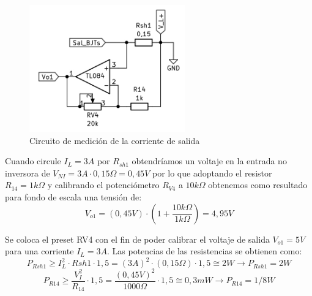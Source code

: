 \begin{figure} [H]
	\centering
	\includegraphics[width=0.6\textwidth]{./imagenes/Sensor_corriente.png}
	\caption{Circuito de medición de la corriente de salida}
	\label{F:Sensor_corriente}
\end{figure} \par 

Cuando circule $I_L =3A$ por $R_{sh1}$ obtendríamos un voltaje en la entrada no inversora de $V_{NI} =3A\cdot 0,15\Omega =0,45V$ por lo que adoptando el resistor $R_{14} =1k\Omega$ y calibrando el potenciómetro $R_{V4} $ a $10k\Omega$ obtenemos como resultado para fondo de escala una tensión de:
\begin{equation}
V_{o1} =(0,45V)\cdot (1+\frac{10k\Omega }{1k\Omega })=4,95V
\end{equation} \par 

Se coloca el preset RV4 con el fin de poder calibrar el voltaje de salida $V_{o1}=5V$ para una corriente $I_L=3A$. Las potencias de las resistencias se obtienen como:
\begin{equation}
P_{Rsh1}\geq I_L^2\cdot Rsh1\cdot 1,5=(3 A)^2\cdot (0,15 \Omega)\cdot 1,5\cong 2 W \to P_{Rsh1}=2W
\end{equation}
\begin{equation}
P_{R14}\geq \frac{V_I^2}{R_{14}}\cdot 1,5=\frac{(0,45 V)^2}{1000\Omega}\cdot 1,5 \cong 0,3 mW \to P_{R14}=1/8W
\end{equation} \par

